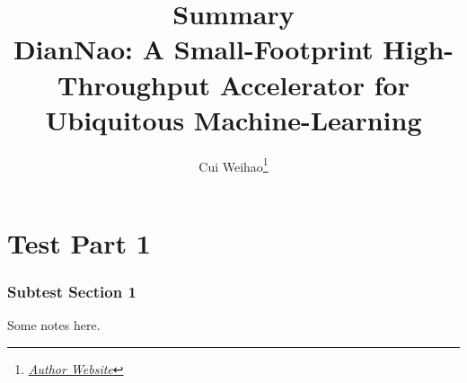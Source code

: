 \documentclass[10pt]{article}
\title{{\Huge Summary}\\{\Large{DianNao: A Small-Footprint High-Throughput Accelerator for Ubiquitous Machine-Learning}}}
\author{Cui Weihao\footnote{\href{https://google.com/}{\textit{Author Website}}}}
\affiliation{SJTU}
\begin{document}
    \maketitle
    \flushbottom
    \newpage
    \pagestyle{fancynotes}
    \part{Test Part 1}
    \lipsum[1]
    \section{Subtest Section 1}
    Some notes here.
\end{document}
